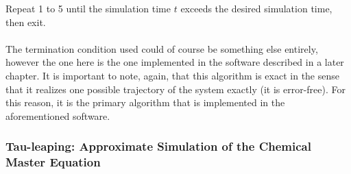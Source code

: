 \documentclass[ugrad,lot,lof,openright,11pt,oneside,onehalfspace]{RUthesis}
\begin{document}
				\noindent
				Repeat 1 to 5 until the simulation time $t$ exceeds the desired simulation time, then exit.\\
				\\
				The termination condition used could of course be something else entirely, however the one here is the one implemented in the software described in a later chapter. It is important to note, again, that this algorithm is exact in the sense that it realizes one possible trajectory of the system exactly (it is error-free). For this reason, it is the primary algorithm that is implemented in the aforementioned software.


			\subsubsection{Tau-leaping: Approximate Simulation of the Chemical Master Equation}
\end{document}
